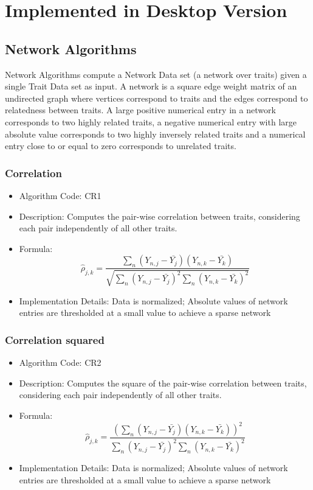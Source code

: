 \documentclass{article}
\begin{document}
\section{Implemented in Desktop Version}

\subsection{Network Algorithms}

Network Algorithms compute a Network Data set (a network over traits) given a single Trait Data set as input. A network is a square edge weight matrix of an undirected graph where vertices correspond to traits and the edges correspond to relatedness between traits. A large positive numerical entry in a network corresponds to two highly related traits, a negative numerical entry with large absolute value corresponds to two highly inversely related traits and a numerical entry close to or equal to zero corresponds to unrelated traits.

\subsubsection{Correlation}

\begin{itemize}
\item Algorithm Code: CR1
\item Description: Computes the pair-wise correlation between traits, considering each pair independently of all other traits.
\item Formula:
\begin{equation*}
\hat{\rho}_{j,k} = \frac{\sum_n (Y_{n,j} - \bar{Y_j})(Y_{n,k} - \bar{Y_k})}{\sqrt{\sum_n (Y_{n,j} - \bar{Y_j})^2 \sum_n (Y_{n,k} - \bar{Y_k})^2}}
\end{equation*}
\item Implementation Details: Data is normalized; Absolute values of network entries are thresholded at a small value to achieve a sparse network 
\end{itemize}

\subsubsection{Correlation squared}

\begin{itemize}
\item Algorithm Code: CR2
\item Description: Computes the square of the pair-wise correlation between traits, considering each pair independently of all other traits.
\item Formula:
\begin{equation*}
\hat{\rho}_{j,k} = \frac{(\sum_n (Y_{n,j} - \bar{Y_j})(Y_{n,k} - \bar{Y_k}))^2}{\sum_n (Y_{n,j} - \bar{Y_j})^2 \sum_n (Y_{n,k} - \bar{Y_k})^2}
\end{equation*}
\item Implementation Details: Data is normalized; Absolute values of network entries are thresholded at a small value to achieve a sparse network 
\end{itemize}
\end{document}
